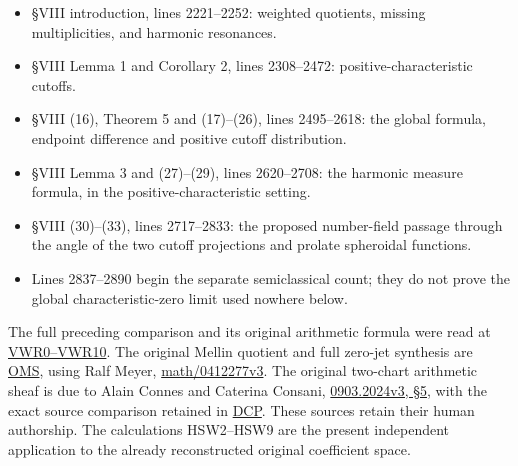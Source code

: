 \begin{itemize}
\tightlist
\item
  §VIII introduction, lines 2221--2252: weighted quotients, missing
  multiplicities, and harmonic resonances.
\item
  §VIII Lemma 1 and Corollary 2, lines 2308--2472:
  positive-characteristic cutoffs.
\item
  §VIII (16), Theorem 5 and (17)--(26), lines 2495--2618: the global
  formula, endpoint difference and positive cutoff distribution.
\item
  §VIII Lemma 3 and (27)--(29), lines 2620--2708: the harmonic measure
  formula, in the positive-characteristic setting.
\item
  §VIII (30)--(33), lines 2717--2833: the proposed number-field passage
  through the angle of the two cutoff projections and prolate spheroidal
  functions.
\item
  Lines 2837--2890 begin the separate semiclassical count; they do not
  prove the global characteristic-zero limit used nowhere below.
\end{itemize}

The full preceding comparison and its original arithmetic formula were
read at
\href{https://github.com/KokunoYumeto/zeta-function-research-reader/blob/main/workbenches/splitzero-tandem/continuations/20260925-full-source-tensor-and-original-divisor/counterfactual/FULL_VERTICAL_WEIGHT_RETURN.md}{VWR0--VWR10}.
The original Mellin quotient and full zero-jet synthesis are
\href{https://github.com/KokunoYumeto/zeta-function-research-reader/blob/36a82ecca98addb8a98b48204e349737856c7223/workbenches/splitzero-tandem/continuations/20260924-cohomology-weight-and-character-lifts/original-character-lifting/tau_lifting_weights_20260924/ORIGINAL_MELLIN_SPECTRAL_SYNTHESIS.md}{OMS},
using Ralf Meyer,
\href{https://arxiv.org/abs/math/0412277v3}{math/0412277v3}. The
original two-chart arithmetic sheaf is due to Alain Connes and Caterina
Consani, \href{https://arxiv.org/abs/0903.2024v3}{0903.2024v3, §5}, with
the exact source comparison retained in
\href{https://github.com/KokunoYumeto/zeta-function-research-reader/blob/36a82ecca98addb8a98b48204e349737856c7223/workbenches/splitzero-tandem/continuations/20260924-cohomology-weight-and-character-lifts/original-character-lifting/tau_lifting_weights_20260924/SOURCE_CC_DOUBLE_PULLBACK.md}{DCP}.
These sources retain their human authorship. The calculations HSW2--HSW9
are the present independent application to the already reconstructed
original coefficient space.

